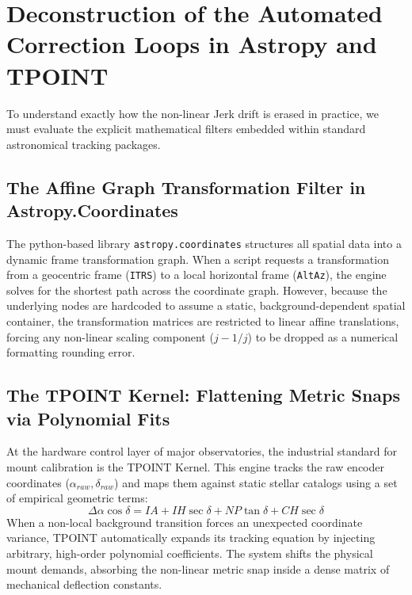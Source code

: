 \documentclass[11pt,a4paper]{article}
\theoremstyle{plain}
\theoremstyle{definition}
\begin{document}
\newpage
\section{Deconstruction of the Automated Correction Loops in Astropy and TPOINT}
To understand exactly how the non-linear Jerk drift is erased in practice, we must evaluate the explicit mathematical filters embedded within standard astronomical tracking packages.

\subsection{The Affine Graph Transformation Filter in Astropy.Coordinates}

The python-based library \texttt{astropy.coordinates} structures all spatial data into a dynamic frame transformation graph. When a script requests a transformation from a geocentric frame (\texttt{ITRS}) to a local horizontal frame (\texttt{AltAz}), the engine solves for the shortest path across the coordinate graph. However, because the underlying nodes are hardcoded to assume a static, background-dependent spatial container, the transformation matrices are restricted to linear affine translations, forcing any non-linear scaling component ($j - 1/j$) to be dropped as a numerical formatting rounding error.
\subsection{The TPOINT Kernel: Flattening Metric Snaps via Polynomial Fits}
At the hardware control layer of major observatories, the industrial standard for mount calibration is the TPOINT Kernel. This engine tracks the raw encoder coordinates ($\alpha_{raw}, \delta_{raw}$) and maps them against static stellar catalogs using a set of empirical geometric terms:
\begin{equation}
\Delta\alpha \cos\delta = IA + IH \sec\delta + NP \tan\delta + CH \sec\delta
\end{equation}
When a non-local background transition forces an unexpected coordinate variance, TPOINT automatically expands its tracking equation by injecting arbitrary, high-order polynomial coefficients. The system shifts the physical mount demands, absorbing the non-linear metric snap inside a dense matrix of mechanical deflection constants.
\end{document}
